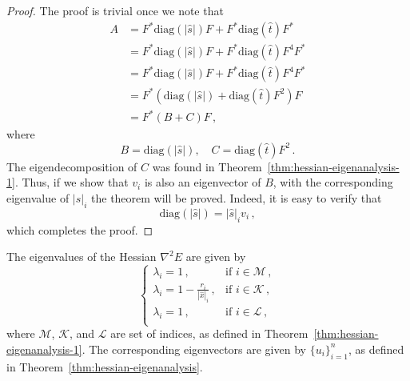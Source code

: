 \begin{proof}[Proof]
  The proof is trivial once we note that
  \begin{equation}
    \label{eq:109}
    \begin{split}
      A
      & = F^{*}\mathrm{diag}(|\hat{s}|)F + F^{*}
      \mathrm{diag}(\hat{t})F^{*} \\
      & = F^{*}\mathrm{diag}(|\hat{s}|)F + F^{*}
      \mathrm{diag}(\hat{t})F^{4}F^{*}\\
      & = F^{*}\mathrm{diag}(|\hat{s}|)F + F^{*}
      \mathrm{diag}(\hat{t})F^{4}F^{*} \\
      & = F^{*}
      \left(
        \mathrm{diag}(|\hat{s}|) +
        \mathrm{diag}(\hat{t})F^{2}
      \right) F \\
      & = F^{*} (B + C) F \,, 
    \end{split}
  \end{equation}
  where
  \begin{equation}
    \label{eq:110}
    B = \mathrm{diag}(|\hat{s}|), \quad C =
    \mathrm{diag}(\hat{t})F^{2} \,. 
  \end{equation}
  The eigendecomposition of $C$ was found in
  Theorem~\ref{thm:hessian-eigenanalysis-1}. Thus, if we show that
  $v_{i}$ is also an eigenvector of $B$, with the corresponding
  eigenvalue of $|\hat{s}|_{i}$ the theorem will be proved. Indeed, it
  is easy to verify that
  \begin{equation}
    \label{eq:111}
    \mathrm{diag}(|\hat{s}|) = |\hat{s}|_{i} v_{i}\,,
  \end{equation}
  which completes the proof.
\end{proof}

\begin{cor}
  The eigenvalues of the Hessian $\nabla^{2}E$ are given by
  \begin{equation}
    \label{eq:112}
    \begin{cases}
      \lambda_{i} = 1 \,, & \text{if } i\in\mathcal{M} \,,\\
      \lambda_{i} = 1 - \frac{r_{i}}{|\hat{x}|_{i}} \,, & \text{if }
      i\in\mathcal K \,, \\
      \lambda_{i} = 1 \,, & \text{if }
      i\in\mathcal L \,, \\
    \end{cases}
  \end{equation}
  where $\mathcal M$, $\mathcal K$, and $\mathcal L$ are set of
  indices, as defined in
  Theorem~\ref{thm:hessian-eigenanalysis-1}. The corresponding  eigenvectors 
  are given by $\{u_{i}\}_{i=1}^{n}$, as defined in
  Theorem~\ref{thm:hessian-eigenanalysis}.
\end{cor}

